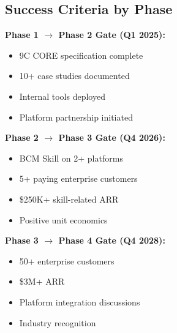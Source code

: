 \subsection{Success Criteria by Phase}

\begin{tcolorbox}[colback=yellow!5!white, colframe=yellow!75!black,
    title=Phase Gate Criteria]

\textbf{Phase 1 $\to$ Phase 2 Gate (Q1 2025):}
\begin{itemize}[nosep]
\item[$\square$] 9C CORE specification complete
\item[$\square$] 10+ case studies documented
\item[$\square$] Internal tools deployed
\item[$\square$] Platform partnership initiated
\end{itemize}

\textbf{Phase 2 $\to$ Phase 3 Gate (Q4 2026):}
\begin{itemize}[nosep]
\item[$\square$] BCM Skill on 2+ platforms
\item[$\square$] 5+ paying enterprise customers
\item[$\square$] \$250K+ skill-related ARR
\item[$\square$] Positive unit economics
\end{itemize}

\textbf{Phase 3 $\to$ Phase 4 Gate (Q4 2028):}
\begin{itemize}[nosep]
\item[$\square$] 50+ enterprise customers
\item[$\square$] \$3M+ ARR
\item[$\square$] Platform integration discussions
\item[$\square$] Industry recognition
\end{itemize}

\end{tcolorbox}

